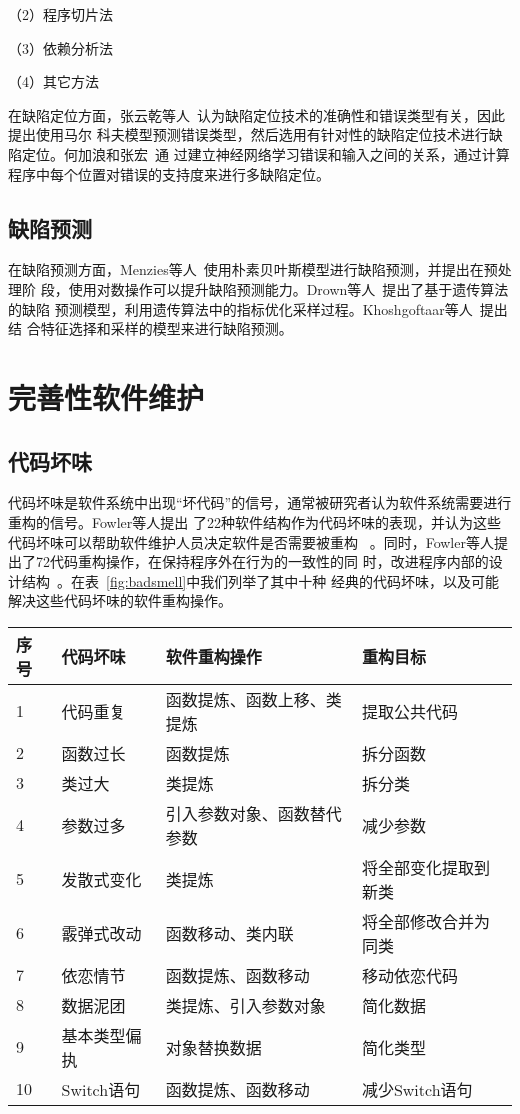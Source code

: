 （2）程序切片法


（3）依赖分析法

（4）其它方法

在缺陷定位方面，张云乾等人~\cite{malcov2013}认为缺陷定位技术的准确性和错误类型有关，因此提出使用马尔
科夫模型预测错误类型，然后选用有针对性的缺陷定位技术进行缺陷定位。何加浪和张宏~\cite{nnfault2013}通
过建立神经网络学习错误和输入之间的关系，通过计算程序中每个位置对错误的支持度来进行多缺陷定位。

\subsection{缺陷预测}

在缺陷预测方面，Menzies等人~\cite{menzies2007data}使用朴素贝叶斯模型进行缺陷预测，并提出在预处理阶
段，使用对数操作可以提升缺陷预测能力。Drown等人~\cite{drown2009evolutionary}提出了基于遗传算法的缺陷
预测模型，利用遗传算法中的指标优化采样过程。Khoshgoftaar等人~\cite{khoshgoftaar2010attribute}提出结
合特征选择和采样的模型来进行缺陷预测。
\section{完善性软件维护}

\subsection{代码坏味}
代码坏味是软件系统中出现``坏代码''的信号，通常被研究者认为软件系统需要进行重构的信号。Fowler等人提出
了22种软件结构作为代码坏味的表现，并认为这些代码坏味可以帮助软件维护人员决定软件是否需要被重构
~\cite{fowler1999refactoring}。同时，Fowler等人提出了72代码重构操作，在保持程序外在行为的一致性的同
时，改进程序内部的设计结构~\cite{fowler1999refactoring}。在表~\ref{fig:badsmell}中我们列举了其中十种
经典的代码坏味，以及可能解决这些代码坏味的软件重构操作。

\begin{center}
\label{fig:badsmell}
\begin{tabular}{|l|l|l|l|}
\hline
序号 & 代码坏味 & 软件重构操作 & 重构目标\\ \hline
1 & 代码重复 & 函数提炼、函数上移、类提炼 & 提取公共代码\\ \hline
2 & 函数过长 & 函数提炼 & 拆分函数\\ \hline
3 & 类过大 & 类提炼 & 拆分类\\ \hline
4 & 参数过多 & 引入参数对象、函数替代参数 & 减少参数\\ \hline
5 & 发散式变化& 类提炼 & 将全部变化提取到新类\\ \hline
6 & 霰弹式改动& 函数移动、类内联 & 将全部修改合并为同类\\ \hline
7 & 依恋情节& 函数提炼、函数移动 & 移动依恋代码\\ \hline
8 & 数据泥团& 类提炼、引入参数对象 & 简化数据\\ \hline
9 & 基本类型偏执& 对象替换数据 & 简化类型 \\ \hline
10 & Switch语句 & 函数提炼、函数移动 & 减少Switch语句\\ \hline
\end{tabular}
\end{center}


